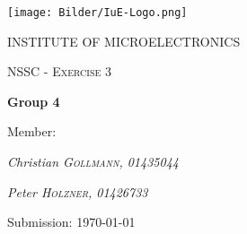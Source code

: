 \documentclass[11pt,a4paper]{article}
\begin{document}
\begin{titlepage}
	\centering
	\begin{center}
	\texttt{[image: Bilder/IuE-Logo.png]}
	\end{center}
	{\scshape\LARGE INSTITUTE OF MICROELECTRONICS\par}
	\vspace{1cm}
	{\scshape\Large NSSC - Exercise 3 \par}
	\vspace{1.5cm}
	{\huge\bfseries Group 4\par}
	\vspace{2cm}
	Member:\par
	{\Large\itshape Christian \textsc{Gollmann, 01435044}\par}
	{\Large\itshape Peter \textsc{Holzner, 01426733}\par}
	\vspace{1.5cm}
	Submission: \today\par
	\vfill
	

	\vfill

\end{titlepage}
\tableofcontents 
\thispagestyle{empty}
\newpage
\setcounter{page}{1}
\newpage
\end{document}
